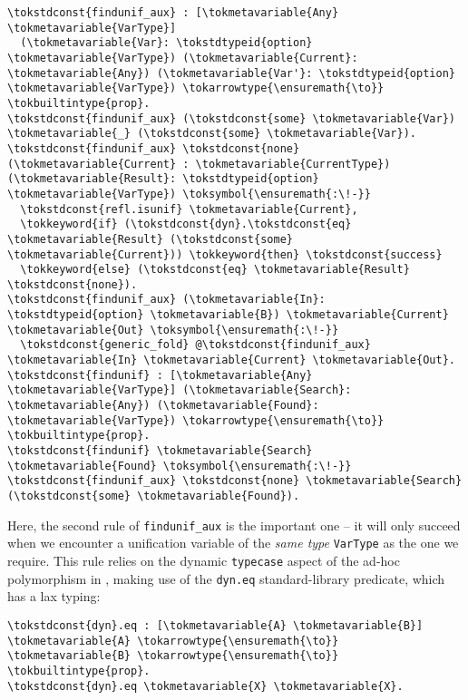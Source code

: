 \begin{verbatim}
\tokstdconst{findunif_aux} : [\tokmetavariable{Any} \tokmetavariable{VarType}]
  (\tokmetavariable{Var}: \tokstdtypeid{option} \tokmetavariable{VarType}) (\tokmetavariable{Current}: \tokmetavariable{Any}) (\tokmetavariable{Var'}: \tokstdtypeid{option} \tokmetavariable{VarType}) \tokarrowtype{\ensuremath{\to}} \tokbuiltintype{prop}.
\tokstdconst{findunif_aux} (\tokstdconst{some} \tokmetavariable{Var}) \tokmetavariable{_} (\tokstdconst{some} \tokmetavariable{Var}).
\tokstdconst{findunif_aux} \tokstdconst{none} (\tokmetavariable{Current} : \tokmetavariable{CurrentType}) (\tokmetavariable{Result}: \tokstdtypeid{option} \tokmetavariable{VarType}) \toksymbol{\ensuremath{:\!-}}
  \tokstdconst{refl.isunif} \tokmetavariable{Current},
  \tokkeyword{if} (\tokstdconst{dyn}.\tokstdconst{eq} \tokmetavariable{Result} (\tokstdconst{some} \tokmetavariable{Current})) \tokkeyword{then} \tokstdconst{success}
  \tokkeyword{else} (\tokstdconst{eq} \tokmetavariable{Result} \tokstdconst{none}).
\tokstdconst{findunif_aux} (\tokmetavariable{In}: \tokstdtypeid{option} \tokmetavariable{B}) \tokmetavariable{Current} \tokmetavariable{Out} \toksymbol{\ensuremath{:\!-}}
  \tokstdconst{generic_fold} @\tokstdconst{findunif_aux} \tokmetavariable{In} \tokmetavariable{Current} \tokmetavariable{Out}.
\tokstdconst{findunif} : [\tokmetavariable{Any} \tokmetavariable{VarType}] (\tokmetavariable{Search}: \tokmetavariable{Any}) (\tokmetavariable{Found}: \tokmetavariable{VarType}) \tokarrowtype{\ensuremath{\to}} \tokbuiltintype{prop}.
\tokstdconst{findunif} \tokmetavariable{Search} \tokmetavariable{Found} \toksymbol{\ensuremath{:\!-}} \tokstdconst{findunif_aux} \tokstdconst{none} \tokmetavariable{Search} (\tokstdconst{some} \tokmetavariable{Found}).
\end{verbatim}

Here, the second rule of \texttt{findunif\_aux} is the important one --
it will only succeed when we encounter a unification variable of the
\emph{same type} \texttt{VarType} as the one we require. This rule
relies on the dynamic \texttt{typecase} aspect of the ad-hoc
polymorphism in \lamprolog, making use of the \texttt{dyn.eq}
standard-library predicate, which has a lax typing:

\begin{verbatim}
\tokstdconst{dyn}.eq : [\tokmetavariable{A} \tokmetavariable{B}] \tokmetavariable{A} \tokarrowtype{\ensuremath{\to}} \tokmetavariable{B} \tokarrowtype{\ensuremath{\to}} \tokbuiltintype{prop}.
\tokstdconst{dyn}.eq \tokmetavariable{X} \tokmetavariable{X}.
\end{verbatim}

